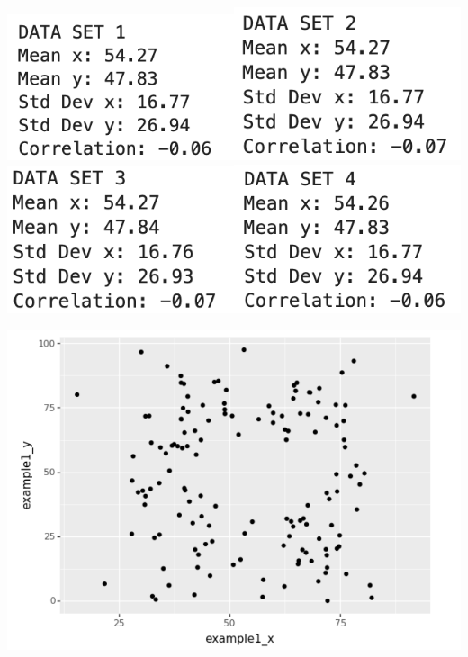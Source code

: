 \documentclass[11pt]{beamer}
\begin{document}
\begin{frame}[c]{}
  \includegraphics[width=0.5\textwidth]{datasaurus_sum_1.png}\includegraphics[width=0.5\textwidth]{datasaurus_sum_2.png}\\
  \includegraphics[width=0.5\textwidth]{datasaurus_sum_3.png}\includegraphics[width=0.5\textwidth]{datasaurus_sum_4.png}
\end{frame}

\begin{frame}[c]{}
  \pause \includegraphics[width=\textwidth]{datasaurus_plot_1.png}
\end{frame}
\end{document}
